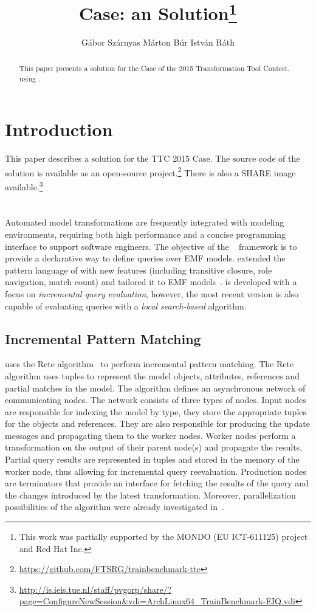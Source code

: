 \documentclass[submission,copyright,creativecommons]{eptcs}
\title{\tb Case: an \eiq Solution\thanks{This work was partially supported by the MONDO (EU ICT-611125) project and Red Hat Inc.}}
\author{G\'{a}bor Sz\'{a}rnyas \qquad M\'{a}rton B\'{u}r \qquad Istv\'{a}n R\'{a}th
\institute{Budapest University of Technology and Economics\\
Department of Measurement and Information Systems\\
H-1117 Magyar tud\'{o}sok krt. 2, Budapest, Hungary}
\email{szarnyas@mit.bme.hu, marton.bur@inf.mit.bme.hu, rath@mit.bme.hu}
}
\begin{document}
\maketitle

\begin{abstract}
This paper presents a solution for the \tb Case of the 2015 Transformation Tool Contest, using \eiq.
\end{abstract}

\section{Introduction}

This paper describes a solution for the TTC 2015 \tb Case. The source code of the solution is available as an open-source project.\footnote{\url{https://github.com/FTSRG/trainbenchmark-ttc}} There is also a SHARE image available.\footnote{\url{http://is.ieis.tue.nl/staff/pvgorp/share/?page=ConfigureNewSession&vdi=ArchLinux64_TrainBenchmark-EIQ.vdi}}

\section{\eiq}

Automated model transformations are frequently integrated with modeling environments, requiring both high performance and a concise programming interface to support software engineers. The objective of the \eiq~\cite{models2010, eiq-homepage} framework is to provide a declarative way to define queries over EMF models. \eiq extended the pattern language of \viatratwo with new features (including transitive closure, role navigation, match count) and tailored it to EMF models~\cite{iqpl}. \eiq is developed with a focus on \emph{incremental query evaluation}, however, the most recent version is also capable of evaluating queries with a \emph{local search-based} algorithm.

\subsection{Incremental Pattern Matching}

\eiq uses the Rete algorithm~\cite{BergmannPhD} to perform incremental pattern matching. The Rete algorithm uses tuples to represent the model objects, attributes, references and partial matches in the model. The algorithm defines an asynchronous network of communicating nodes. The network consists of three types of nodes. Input nodes are responsible for indexing the model by type, \ie they store the appropriate tuples for the objects and references. They are also responsible for producing the update messages and propagating them to the worker nodes. Worker nodes perform a transformation on the output of their parent node(s) and propagate the results. Partial query results are represented in tuples and stored in the memory of the worker node, thus allowing for incremental query reevaluation. Production nodes are terminators that provide an interface for fetching the results of the query and the changes introduced by the latest transformation. Moreover, parallelization possibilities of the algorithm were already investigated in~\cite{Bergmann-gtvmt09}.
\end{document}
